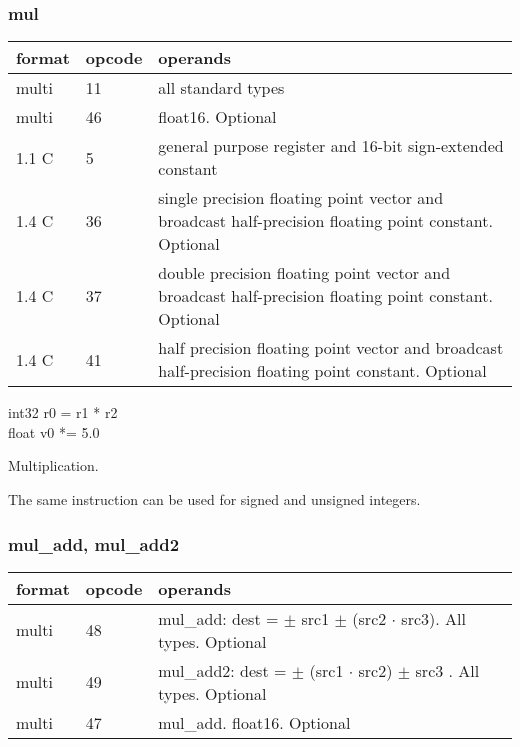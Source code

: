 \documentclass[forwardcom.tex]{subfiles}
\begin{document}
\subsubsection{mul}
\label{table:mulInstruction}
\begin{tabular}{|p{12mm}|p{12mm}|p{110mm}|}
\hline
\bfseries format & \bfseries opcode & \bfseries operands \\ \hline
multi & 11 & all standard types \\ \hline
multi & 46 & float16. Optional \\ \hline
1.1 C &  5 & general purpose register and 16-bit sign-extended constant \\ \hline
1.4 C & 36 & single precision floating point vector and broadcast half-precision floating point constant. Optional \\ \hline
1.4 C & 37 & double precision floating point vector and broadcast half-precision floating point constant. Optional \\ \hline
1.4 C & 41 & half precision floating point vector and broadcast half-precision floating point constant. Optional \\ \hline
\end{tabular}
\vspace{2mm}

int32 r0 = r1 * r2 \\
float v0 *= 5.0
\vspace{2mm}

Multiplication.
\vspace{2mm}

The same instruction can be used for signed and unsigned integers.

\subsubsection{mul\_add, mul\_add2}
\label{table:mulAddInstruction}
\begin{tabular}{|p{12mm}|p{12mm}|p{110mm}|}
\hline
\bfseries format & \bfseries opcode & \bfseries operands \\ \hline
multi & 48 & mul\_add: dest = $\pm$ src1 $\pm$ (src2 $\cdot$ src3). All types. Optional \\ 
multi & 49 & mul\_add2: dest = $\pm$ (src1 $\cdot$ src2) $\pm$ src3 . All types. Optional \\
multi & 47 & mul\_add. float16. Optional \\ \hline
\hline
\end{tabular}
\vspace{2mm}
\end{document}
